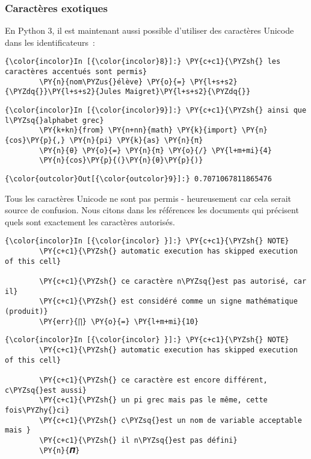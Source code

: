     \hypertarget{caractuxe8res-exotiques}{%
\subsubsection{Caractères exotiques}\label{caractuxe8res-exotiques}}

    En Python 3, il est maintenant aussi possible d'utiliser des caractères
Unicode dans les identificateurs~:

    \begin{Verbatim}[commandchars=\\\{\}]
{\color{incolor}In [{\color{incolor}8}]:} \PY{c+c1}{\PYZsh{} les caractères accentués sont permis}
        \PY{n}{nom\PYZus{}élève} \PY{o}{=} \PY{l+s+s2}{\PYZdq{}}\PY{l+s+s2}{Jules Maigret}\PY{l+s+s2}{\PYZdq{}}
\end{Verbatim}


    \begin{Verbatim}[commandchars=\\\{\}]
{\color{incolor}In [{\color{incolor}9}]:} \PY{c+c1}{\PYZsh{} ainsi que l\PYZsq{}alphabet grec}
        \PY{k+kn}{from} \PY{n+nn}{math} \PY{k}{import} \PY{n}{cos}\PY{p}{,} \PY{n}{pi} \PY{k}{as} \PY{n}{π}
        \PY{n}{θ} \PY{o}{=} \PY{n}{π} \PY{o}{/} \PY{l+m+mi}{4}
        \PY{n}{cos}\PY{p}{(}\PY{n}{θ}\PY{p}{)}
\end{Verbatim}


\begin{Verbatim}[commandchars=\\\{\}]
{\color{outcolor}Out[{\color{outcolor}9}]:} 0.7071067811865476
\end{Verbatim}
            
    Tous les caractères Unicode ne sont pas permis - heureusement car cela
serait source de confusion. Nous citons dans les références les
documents qui précisent quels sont exactement les caractères autorisés.

    \begin{Verbatim}[commandchars=\\\{\}]
{\color{incolor}In [{\color{incolor} }]:} \PY{c+c1}{\PYZsh{} NOTE}
        \PY{c+c1}{\PYZsh{} automatic execution has skipped execution of this cell}
        
        \PY{c+c1}{\PYZsh{} ce caractère n\PYZsq{}est pas autorisé, car il}
        \PY{c+c1}{\PYZsh{} est considéré comme un signe mathématique (produit)}
        \PY{err}{∏} \PY{o}{=} \PY{l+m+mi}{10}
\end{Verbatim}


    \begin{Verbatim}[commandchars=\\\{\}]
{\color{incolor}In [{\color{incolor} }]:} \PY{c+c1}{\PYZsh{} NOTE}
        \PY{c+c1}{\PYZsh{} automatic execution has skipped execution of this cell}
        
        \PY{c+c1}{\PYZsh{} ce caractère est encore différent, c\PYZsq{}est aussi}
        \PY{c+c1}{\PYZsh{} un pi grec mais pas le même, cette fois\PYZhy{}ci}
        \PY{c+c1}{\PYZsh{} c\PYZsq{}est un nom de variable acceptable mais }
        \PY{c+c1}{\PYZsh{} il n\PYZsq{}est pas défini}
        \PY{n}{𝞟}
\end{Verbatim}


